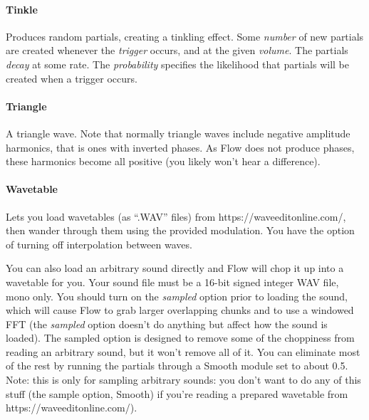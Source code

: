\documentclass{article}
\newcommand\name{Flow}
\begin{document}
\paragraph{Tinkle}  Produces random partials, creating a tinkling effect.  Some {\it number} of new partials are created whenever the {\it trigger} occurs, and at the given {\it volume}.  The partials {\it decay} at some rate.  The {\it probability} specifies the likelihood that partials will be created when a trigger occurs.

\paragraph{Triangle}  A triangle wave.  Note that normally triangle waves include negative amplitude harmonics, that is ones with inverted phases.  As {\name} does not produce phases, these harmonics become all positive (you likely won't hear a difference).



\paragraph{Wavetable}  Lets you load wavetables (as ``.WAV'' files) from https:/\!/waveeditonline.com/, then wander through them using the provided modulation.  You have the option of turning off interpolation between waves.

You can also load an arbitrary sound directly and Flow will chop it up into a wavetable for you.  Your sound file must be a 16-bit signed integer WAV file, mono only.  You should turn on the {\it sampled} option prior to loading the sound, which will cause Flow to grab larger overlapping chunks and to use a windowed FFT (the {\it sampled} option doesn't do anything but affect how the sound is loaded).  The sampled option is designed to remove some of the choppiness from reading an arbitrary sound, but it won't remove all of it.  You can eliminate most of the rest by running the partials through a Smooth module set to about 0.5.  Note: this is only for sampling arbitrary sounds:  you don't want to do any of this stuff (the sample option, Smooth) if you're reading a prepared wavetable from https:/\!/waveeditonline.com/).
\end{document}
